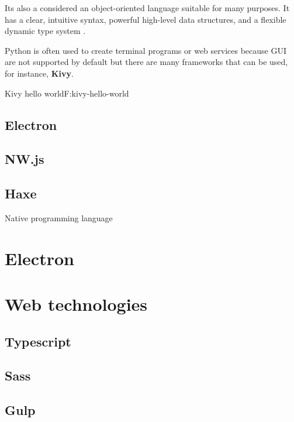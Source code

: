 Its also a considered an object-oriented language suitable for many purposes.
It has a clear, intuitive syntax, powerful high-level data structures, and a
flexible dynamic type system \cite{An93pythonfor}.

Python is often used to create terminal programs or web services because GUI
are not supported by default but there are many frameworks that can be used,
for instance, \textbf{Kivy}.

\begin{codefigure}{Kivy hello world}{F:kivy-hello-world}
\end{codefigure}

\subsection{Electron}

\subsection{NW.js}

\subsection{Haxe}

Native programming language

\section{Electron}

\section{Web technologies}

\subsection{Typescript}

\subsection{Sass}

\subsection{Gulp}

